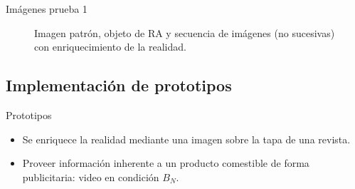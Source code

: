 \begin{frame}{Imágenes prueba 1}
\begin{figure}[tbhp]
    \caption*{\tiny{Imagen patrón, objeto de RA y secuencia de imágenes (no sucesivas) con enriquecimiento de la realidad.}}
    \label{fig:secuencia_ejemplo_BN}               %
    \end{figure}
\end{frame}

\subsection{Implementación de prototipos}
  \begin{frame}{Prototipos}
    \begin{itemize}
      \item Se enriquece la realidad mediante una imagen sobre la tapa de una revista.
      \item Proveer información inherente a un producto comestible de forma publicitaria: video en condición $B_{N}$.
    \end{itemize}
  \end{frame}

